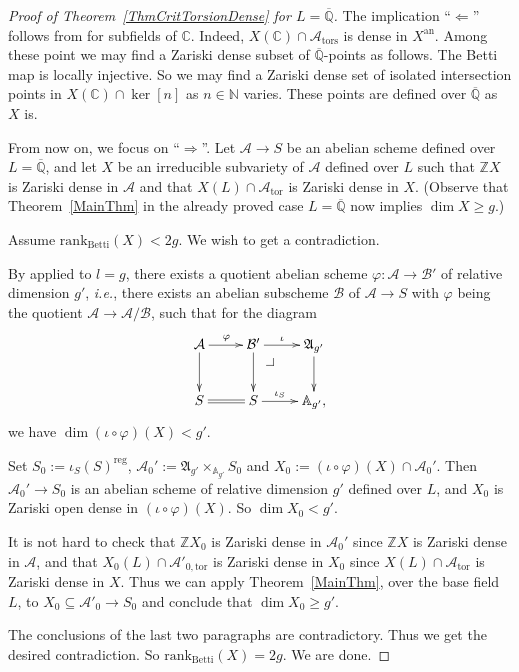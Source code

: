\documentclass[12pt,oneside]{amsart}
\makeatletter
\numberwithin{maincounter}{section}
\numberwithin{equation}{section}
\def\NN{\mathbb{N}}
\def\CC{\mathbb{C}}
\def\ZZ{\mathbb{Z}}
\def\QQ{\mathbb{Q}}
\newcommand{\cal}{\mathcal}
\newcommand{\cA}{\cal{A}}
\newcommand{\cB}{\cal{B}}
\newcommand{\IC}{{\CC}}
\newcommand{\IQbar}{{\overline{\QQ}}}
\newcommand{\IN}{{\NN}}
\newcommand{\pullbackcorner}[1][dr]{\save*!/#1-1.7pc/#1:(-1.5,1.5)@^{|-}\restore}
\makeatother
\begin{document}

\begin{proof}[Proof of Theorem~\ref{ThmCritTorsionDense} for $L=\IQbar$]
The implication ``$\Leftarrow$'' follows from
\cite[Proposition~2.1.1]{ACZBetti} for subfields of $\IC$.
Indeed,
$X(\IC)\cap \cA_{\mathrm{tors}}$ is dense in $X^{\mathrm{an}}$.
Among these point we may find a Zariski dense subset of
$\IQbar$-points as follows. 
The
Betti map is locally injective. So we may find a Zariski dense set of
isolated intersection points in $X(\IC)\cap \ker[n]$ as $n\in\IN$
varies.
These points are defined over $\IQbar$ as $X$ is. 

From now on, we focus on ``$\Rightarrow$''. Let $\cA \rightarrow S$ be an abelian scheme defined over $L=\IQbar$, and let $X$ be an irreducible subvariety of $\cA$ defined over $L$ such that $\ZZ X$ is Zariski dense in $\cA$ and that $X(L) \cap \cA_{\mathrm{tor}}$ is Zariski dense in $X$. 
(Observe that Theorem~\ref{MainThm} in the already proved case
$L=\IQbar$ now implies $\dim X\ge g$.)

Assume $\mathrm{rank}_{\mathrm{Betti}}(X) < 2g$. We wish to get a contradiction.

By \cite[Theorem~1.1]{GaoBettiRank} applied to $l = g$, there exists a quotient abelian scheme $\varphi \colon \cA \rightarrow \cB'$ of relative dimension $g'$, \textit{i.e.}, there exists an abelian subscheme $\cB$ of $\cA \rightarrow S$ with $\varphi$ being the quotient $\cA \rightarrow \cA/\cB$, such that for the diagram
    \begin{equation*}
      \xymatrix{
        \cA \ar[d]\ar[r]^{\varphi}&      \cB' \ar[d] \ar[r]^-{\iota} \pullbackcorner & \mathfrak{A}_{g'}\ar[d] \\
        S \ar@{=}[r]&      S \ar[r]^-{\iota_S} & \mathbb{A}_{g'},
      }
    \end{equation*}
we have $\dim (\iota\circ\varphi)(X) < g'$. 

Set $S_0 := \iota_S(S)^{\mathrm{reg}}$, $\cA_0' := \mathfrak{A}_{g'} \times_{\mathbb{A}_{g'}} S_0$ and $X_0 := (\iota\circ \varphi)(X) \cap \cA_0'$. Then $\cA_0' \rightarrow S_0$ is an abelian scheme of relative dimension $g'$ defined over $L$, and $X_0$ is Zariski open dense in $(\iota\circ\varphi)(X)$. So $\dim X_0 < g'$.

It is not hard to check that $\ZZ X_0$ is Zariski dense in $\cA_0'$
since $\ZZ X$ is Zariski dense in $\cA$, and that $X_0(L) \cap
\cA'_{0,\mathrm{tor}}$ is Zariski dense in $X_0$ since $X(L) \cap
\cA_{\mathrm{tor}}$ is Zariski dense in $X$. Thus we can apply
Theorem~\ref{MainThm}, over the base field $L$,
to $X_0 \subseteq \cA'_0 \rightarrow S_0$ and conclude that $\dim X_0 \ge g'$.

The conclusions of the last two paragraphs are contradictory. Thus we get the desired contradiction. 
So $\mathrm{rank}_{\mathrm{Betti}}(X) = 2g$. We are done.%
\end{proof}
\end{document}
